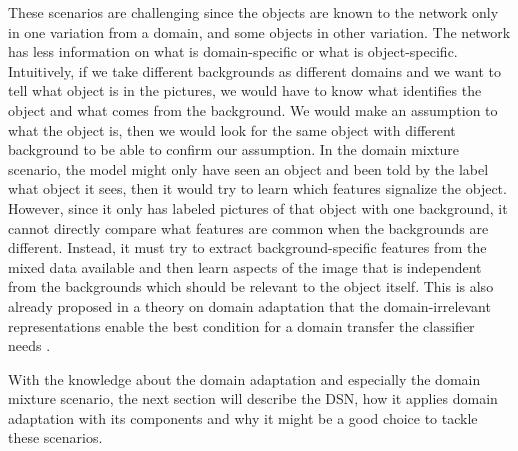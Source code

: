 These scenarios are challenging since the objects are known to the network only in one variation from a domain, and some objects in other variation. The network has less information on what is domain-specific or what is object-specific. Intuitively, if we take different backgrounds as different domains and we want to tell what object is in the pictures, we would have to know what identifies the object and what comes from the background. We would make an assumption to what the object is, then we would look for the same object with different background to be able to confirm our assumption. In the domain mixture scenario, the model might only have seen an object and been told by the label what object it sees, then it would try to learn which features signalize the object. However, since it only has labeled pictures of that object with one background, it cannot directly compare what features are common when the backgrounds are different. Instead, it must try to extract background-specific features from the mixed data available and then learn aspects of the image that is independent from the backgrounds which should be relevant to the object itself. This is also already proposed in a theory on domain adaptation that the domain-irrelevant representations enable the best condition for a domain transfer the classifier needs  \cite{DArepres}.

With the knowledge about the domain adaptation and especially the domain mixture scenario, the next section will describe the DSN, how it applies domain adaptation with its components and why it might be a good choice to tackle these scenarios.